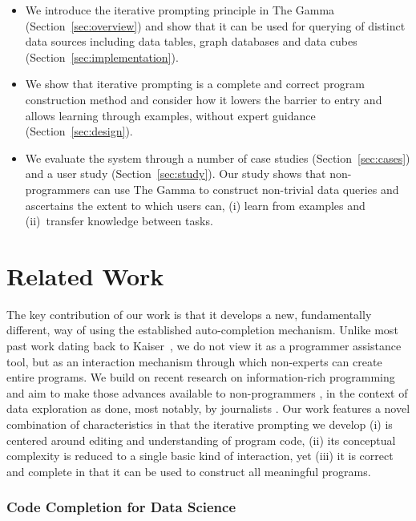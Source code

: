 \documentclass[manuscript,review,anonymous]{acmart}
\begin{document}
\begin{itemize}
\item We introduce the iterative prompting principle in The Gamma (Section~\ref{sec:overview})
  and show that it can be used for querying of distinct data sources including data tables, graph
  databases and data cubes (Section~\ref{sec:implementation}).

\item We show that iterative prompting is a complete and correct program construction method and
  consider how it lowers the barrier to entry and allows learning through examples, without
  expert guidance (Section~\ref{sec:design}).

\item We evaluate the system through a number of case studies (Section~\ref{sec:cases})
  and a user study (Section~\ref{sec:study}). Our study shows that non-programmers can use The Gamma
  to construct non-trivial data queries and ascertains the extent to which users can,
  (i) learn from examples and (ii)~transfer knowledge between tasks.
\end{itemize}


\section{Related Work}

The key contribution of our work is that it develops a new, fundamentally different, way of using the
established auto-completion mechanism. Unlike most past work dating back to Kaiser~\cite{assistants},
we do not view it as a programmer assistance tool, but as an interaction mechanism through which
non-experts can create entire programs. We build on recent research on information-rich
programming \cite{inforich} and aim to make those advances available to non-programmers
\cite{enduser,smallmatter}, in the context of data exploration as done, most notably, by
journalists \cite{ddj}. Our work features a novel combination of characteristics in that
the iterative prompting we develop (i) is centered around editing and understanding of program code,
(ii) its conceptual complexity is reduced to a single basic kind of interaction, yet (iii) it is
correct and complete in that it can be used to construct all meaningful programs.

\subsubsection*{Code Completion for Data Science}
\end{document}
